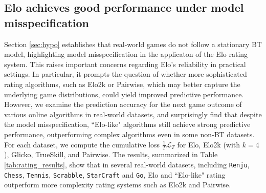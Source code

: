 \subsection{Elo achieves good performance under model misspecification}
\label{sec:realdata}

Section \ref{sec:hypo} establishes that real-world games do not follow a stationary BT model, highlighting model misspecification in the applicaton of the Elo rating system. This raises important concerns regarding Elo’s reliability in practical settings. In particular, it prompts the question of whether more sophisticated rating algorithms, such as Elo2k or Pairwise, which may better capture the underlying game distributions, could yield improved predictive performance. However, we examine the prediction accuracy for the next game outcome of various online algorithms in real-world datasets, and surprisingly find that despite the model misspecification, ``Elo-like" algorithms still achieve strong predictive performance, outperforming complex algorithms even in some non-BT datasets. For each dataset, we compute the cumulative loss $\frac{1}{T} \mathcal{L}_T$ for Elo, Elo2k (with $k=4$), Glicko, TrueSkill, and Pairwise.\footnotemark{} The results, summarized in Table \ref{tab:rating_results}, show that in several real-world datasets, including \texttt{Renju}, \texttt{Chess}, \texttt{Tennis}, \texttt{Scrabble}, \texttt{StarCraft} and \texttt{Go}, Elo and ``Elo-like" rating outperform more complexity rating systems such as Elo2k and Pairwise.


